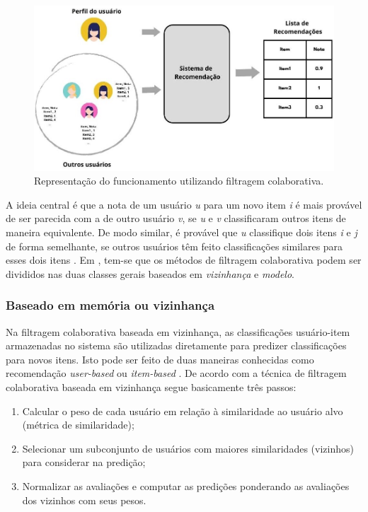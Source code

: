 \documentclass[portuguese]{textolivre}
\begin{document}
\begin{figure}[htbp]
\centering
\begin{minipage}{.8\textwidth}
 \includegraphics[width=\textwidth]{imagens/fig-001.jpg}
 \caption{Representação do funcionamento utilizando filtragem colaborativa.}
 \label{fig-img-001}
\end{minipage}
\end{figure}


A ideia central é que a nota de um usuário \textit{u} para um novo item \textit{i} é mais provável de ser parecida com a de outro usuário \textit{v}, se \textit{u} e \textit{v} classificaram outros itens de maneira equivalente. De modo similar, é provável que \textit{u} classifique dois itens \textit{i} e \textit{j} de forma semelhante, se outros usuários têm feito classificações similares para esses dois itens \cite{Ricci:2010:RSH:1941884}. Em \textcite{Burke2002,Burke2007}, tem-se que os métodos de filtragem colaborativa podem ser divididos nas duas classes gerais baseados em \textit{vizinhança} e \textit{modelo}. 

\subsubsection{Baseado em memória ou vizinhança}
Na filtragem colaborativa baseada em vizinhança, as classificações usuário-item armazenadas no sistema são utilizadas diretamente para predizer classificações para novos itens. Isto pode ser feito de duas maneiras conhecidas como recomendação \textit{user-based} ou \textit{item-based} \cite{Ricci:2010:RSH:1941884}. De acordo com \textcite{cazella2010ciencia} a técnica de filtragem colaborativa baseada em vizinhança segue basicamente três passos:

\begin{enumerate}
	\item Calcular o peso de cada usuário em relação à similaridade ao usuário alvo (métrica de similaridade); 
	\item Selecionar um subconjunto de usuários com maiores similaridades (vizinhos) para considerar na predição; 
	\item Normalizar as avaliações e computar as predições ponderando as avaliações dos vizinhos com seus pesos.
\end{enumerate}
\end{document}
